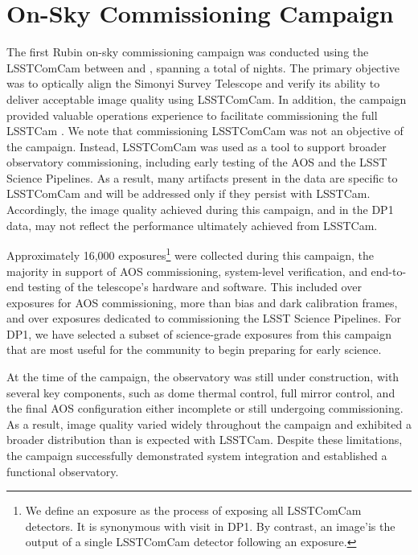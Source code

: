 \section{On-Sky Commissioning Campaign \label{sec:on_sky_campaign}}

The first Rubin on-sky commissioning campaign was conducted using the \gls{LSSTComCam} between \campaignstartdate and \dponeenddate, spanning a total of \nnightscomcam nights.
The primary objective was to optically align the Simonyi Survey Telescope and verify its ability to deliver acceptable image quality using \gls{LSSTComCam}.
In addition, the campaign provided valuable operations experience to facilitate commissioning the full \gls{LSSTCam} \citep{2024SPIE13096E..1OL,2024SPIE13096E..1SR}.
We note that commissioning \gls{LSSTComCam}  was not an objective of the campaign.
Instead, LSSTComCam was used as a tool to support broader observatory commissioning, including early testing of the \gls{AOS} and the LSST Science Pipelines.
As a result,
many artifacts present in the data are specific to \gls{LSSTComCam} and will be addressed only if they persist with \gls{LSSTCam}.
Accordingly, the image quality achieved during this campaign, and in the \gls{DP1} data, may not reflect the performance ultimately achieved from \gls{LSSTCam}.

Approximately 16,000 exposures\footnote{We define an exposure as the process of exposing all LSSTComCam detectors. It is synonymous with visit in DP1. By contrast, an image'is the output of a single LSSTComCam detector following an exposure.} 
were collected during this campaign, the majority in support of \gls{AOS} commissioning, system-level verification, and end-to-end testing of the telescope’s hardware and software.
This included over \nexposuresaoscommissioning exposures for \gls{AOS} commissioning, more than \nexposurescalibcommissioning bias and dark calibration frames, and over \nexposuresspcommissioning exposures dedicated to commissioning the LSST Science Pipelines.
For \gls{DP1}, we have selected a subset of \nexposures science-grade exposures from this campaign that are most useful for the community to begin preparing for early science.

At the time of the campaign, the observatory was still under construction, with several key components, such as dome thermal control, full mirror control, and the final \gls{AOS} configuration either incomplete or still undergoing commissioning.
As a result, image quality varied widely throughout the campaign and exhibited a broader distribution than is expected with \gls{LSSTCam}.
Despite these limitations, the campaign successfully demonstrated system integration and established a functional observatory.

